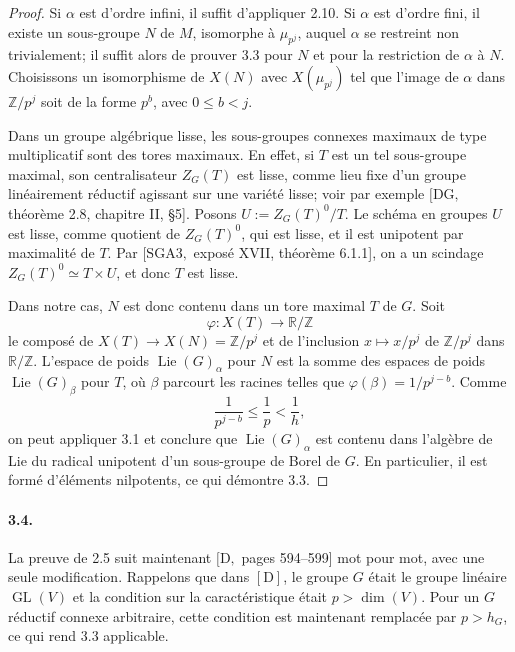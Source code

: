\documentclass[11pt]{article}
\newcommand{\Lie}{\operatorname{Lie}}
\newcommand{\GL}{\operatorname{GL}}
\begin{document}
\begin{proof}
Si \(\alpha\) est d'ordre infini, il suffit d'appliquer 2.10. Si \(\alpha\) est d'ordre
fini, il existe un sous-groupe \(N\) de \(M\), isomorphe à \(\mu_{p^j}\), auquel
\(\alpha\) se restreint non trivialement; il suffit alors de prouver 3.3 pour \(N\) et
pour la restriction de \(\alpha\) à \(N\). Choisissons un isomorphisme de \(X(N)\) avec
\(X(\mu_{p^j})\) tel que l'image de \(\alpha\) dans \(\mathbb Z/p^j\) soit de la forme
\(p^b\), avec \(0\le b<j\).

Dans un groupe algébrique lisse, les sous-groupes connexes maximaux de type multiplicatif
sont des tores maximaux. En effet, si \(T\) est un tel sous-groupe maximal, son
centralisateur \(Z_G(T)\) est lisse, comme lieu fixe d'un groupe linéairement réductif
agissant sur une variété lisse; voir par exemple \([\mathrm{DG},\) théorème 2.8,
chapitre II, \S5]. Posons \(U:=Z_G(T)^0/T\). Le schéma en groupes \(U\) est lisse,
comme quotient de \(Z_G(T)^0\), qui est lisse, et il est unipotent par maximalité de
\(T\). Par \([\mathrm{SGA3},\) exposé XVII, théorème 6.1.1], on a un scindage
\(Z_G(T)^0\simeq T\times U\), et donc \(T\) est lisse.

Dans notre cas, \(N\) est donc contenu dans un tore maximal \(T\) de \(G\). Soit
\begin{equation}
  \varphi:X(T)\longrightarrow\mathbb R/\mathbb Z
  \tag{3.3.1}
\end{equation}
le composé de \(X(T)\to X(N)=\mathbb Z/p^j\) et de l'inclusion
\(x\mapsto x/p^j\) de \(\mathbb Z/p^j\) dans \(\mathbb R/\mathbb Z\). L'espace de poids
\(\Lie(G)_\alpha\) pour \(N\) est la somme des espaces de poids \(\Lie(G)_\beta\) pour
\(T\), où \(\beta\) parcourt les racines telles que \(\varphi(\beta)=1/p^{j-b}\). Comme
\[
  \frac1{p^{j-b}}\le\frac1p<\frac1h,
\]
on peut appliquer 3.1 et conclure que \(\Lie(G)_\alpha\) est contenu dans l'algèbre de
Lie du radical unipotent d'un sous-groupe de Borel de \(G\). En particulier, il est formé
d'éléments nilpotents, ce qui démontre 3.3.
\end{proof}

\paragraph{3.4.}
La preuve de 2.5 suit maintenant \([\mathrm D,\) pages 594--599] mot pour mot, avec une
seule modification. Rappelons que dans \([\mathrm D]\), le groupe \(G\) était le groupe
linéaire \(\GL(V)\) et la condition sur la caractéristique était \(p>\dim(V)\). Pour un
\(G\) réductif connexe arbitraire, cette condition est maintenant remplacée par
\(p>h_G\), ce qui rend 3.3 applicable.
\end{document}
